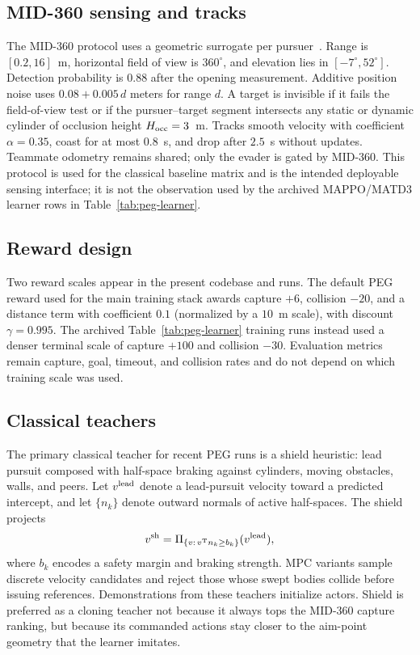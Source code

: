 \documentclass{SCIS2026}
\begin{document}
\subsection{MID-360 sensing and tracks}
\label{sec:mid360}
The MID-360 protocol uses a geometric surrogate per pursuer~\cite{open2024}. Range is $[0.2,16]$~m, horizontal field of view is $360^\circ$, and elevation lies in $[-7^\circ,52^\circ]$. Detection probability is $0.88$ after the opening measurement. Additive position noise uses $0.08+0.005\,d$ meters for range $d$. A target is invisible if it fails the field-of-view test or if the pursuer--target segment intersects any static or dynamic cylinder of occlusion height $H_{\rm occ}=3$~m. Tracks smooth velocity with coefficient $\alpha=0.35$, coast for at most $0.8$~s, and drop after $2.5$~s without updates. Teammate odometry remains shared; only the evader is gated by MID-360. This protocol is used for the classical baseline matrix and is the intended deployable sensing interface; it is not the observation used by the archived MAPPO/MATD3 learner rows in Table~\ref{tab:peg-learner}.

\subsection{Reward design}
\label{sec:reward}
Two reward scales appear in the present codebase and runs. The default PEG reward used for the main training stack awards capture $+6$, collision $-20$, and a distance term with coefficient $0.1$ (normalized by a $10$~m scale), with discount $\gamma=0.995$. The archived Table~\ref{tab:peg-learner} training runs instead used a denser terminal scale of capture $+100$ and collision $-30$. Evaluation metrics remain capture, goal, timeout, and collision rates and do not depend on which training scale was used.

\subsection{Classical teachers}
The primary classical teacher for recent PEG runs is a shield heuristic: lead pursuit composed with half-space braking against cylinders, moving obstacles, walls, and peers. Let $v^{\rm lead}$ denote a lead-pursuit velocity toward a predicted intercept, and let $\{n_k\}$ denote outward normals of active half-spaces. The shield projects
\begin{equation}
v^{\rm sh}=\Pi_{\{v:\,v^{\rm T}n_k\ge b_k\}}(v^{\rm lead}),
\label{eq:shield}
\end{equation}
where $b_k$ encodes a safety margin and braking strength. MPC variants sample discrete velocity candidates and reject those whose swept bodies collide before issuing references. Demonstrations from these teachers initialize actors. Shield is preferred as a cloning teacher not because it always tops the MID-360 capture ranking, but because its commanded actions stay closer to the aim-point geometry that the learner imitates.
\end{document}
